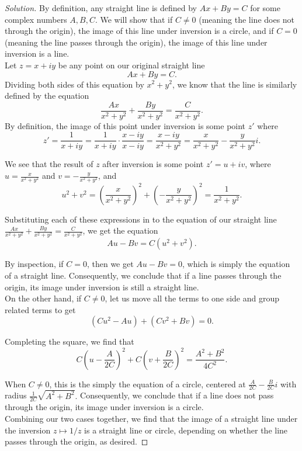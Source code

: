 \documentclass[11pt]{article}
\newenvironment{solution}
  {\renewcommand\qedsymbol{$\blacksquare$}\begin{proof}[Solution]}
  {\end{proof}}
\theoremstyle{definition}
\begin{document}
\begin{solution}
By definition, any straight line is defined by $Ax + By = C$ for some complex numbers $A, B, C$. We will show that if $C \neq 0$ (meaning the line does not through the origin), the image of this line under inversion is a circle, and if $C = 0$ (meaning the line passes through the origin), the image of this line under inversion is a line. \\

Let $z = x + iy$ be any point on our original straight line \[Ax + By = C.\] Dividing both sides of this equation by $x^2+y^2$, we know that the line is similarly defined by the equation
\[ \frac{Ax}{x^2+y^2} + \frac{By}{x^2+y^2} = \frac{C}{x^2+y^2}. \]
By definition, the image of this point under inversion is some point $z'$ where
\[ z' = \frac{1}{x+iy} = \frac{1}{x+iy} \cdot \frac{x-iy}{x-iy} = \frac{x-iy}{x^2+y^2} = \frac{x}{x^2+y^2} - \frac{y}{x^2+y^2}i. \] 


We see that the result of $z$ after inversion is some point $z' = u + iv$, where $u = \frac{x}{x^2+y^2}$ and $v = -\frac{y}{x^2+y^2}$, and \[u^2 + v^2 = \left( \frac{x}{x^2+y^2} \right)^2 + \left(-\frac{y}{x^2+y^2} \right)^2 = \frac{1}{x^2+y^2}. \]

Substituting each of these expressions in to the equation of our straight line $\frac{Ax}{x^2+y^2} + \frac{By}{x^2+y^2} = \frac{C}{x^2+y^2}$, we get the equation
\[ Au - Bv = C(u^2+v^2).\]

By inspection, if $C=0$, then we get $Au - Bv = 0$, which is simply the equation of a straight line. Consequently, we conclude that if a line passes through the origin, its image under inversion is still a straight line. \\

On the other hand, if $C \neq 0$, let us move all the terms to one side and group related terms to get
\[ (Cu^2 - Au) + (Cv^2 + Bv) = 0.\]

Completing the square, we find that
\[ C\left(u - \frac{A}{2C}\right)^2 + C\left(v + \frac{B}{2C}\right)^2 = \frac{A^2 + B^2}{4C^2}.\]

When $C \neq 0$, this is the simply the equation of a circle, centered at $\frac{A}{2C} - \frac{B}{2C} i$ with radius $\frac{1}{2C}\sqrt{A^2 +B^2}.$ Consequently, we conclude that if a line does not pass through the origin, its image under inversion is a circle. \\

Combining our two cases together, we find that the image of a straight line under the inversion $z \mapsto 1/z$ is a straight line or circle, depending on whether the line passes through the origin, as desired.
\end{solution}
\end{document}
